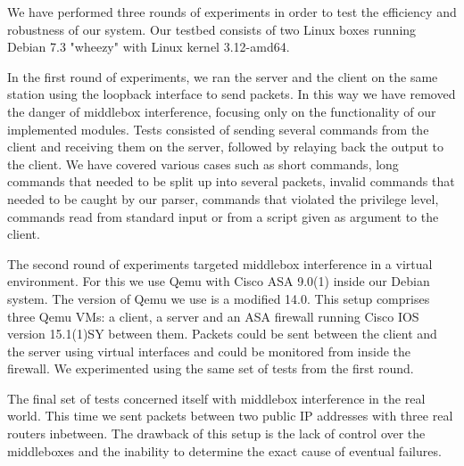 We have performed three rounds of experiments in order to test the efficiency and
robustness of our system. Our testbed consists of two Linux boxes running Debian 7.3
"wheezy" with Linux kernel 3.12-amd64.

In the first round of experiments, we ran the server and the client on the same
station using the loopback interface to send packets. In this way we have removed
the danger of middlebox interference, focusing only on the functionality of our
implemented modules. Tests consisted of sending several commands from the client
and receiving them on the server, followed by relaying back the output to the client.
We have covered various cases such as short commands, long commands that needed to
be split up into several packets, invalid commands that needed to be caught by
our parser, commands that violated the privilege level, commands read from standard
input or from a script given as argument to the client.

The second round of experiments targeted middlebox interference in a virtual
environment. For this we use Qemu with Cisco ASA 9.0(1) inside our Debian system.
The version of Qemu we use is a modified 14.0. This setup comprises three Qemu VMs:
a client, a server and an ASA firewall running Cisco IOS version 15.1(1)SY between
them. Packets could be sent between the client and the server using virtual
interfaces and could be monitored from inside the firewall. We experimented using
the same set of tests from the first round.

The final set of tests concerned itself with middlebox interference in the real
world. This time we sent packets between two public IP addresses with three real
routers inbetween. The drawback of this setup is the lack of control over the
middleboxes and the inability to determine the exact cause of eventual failures.
